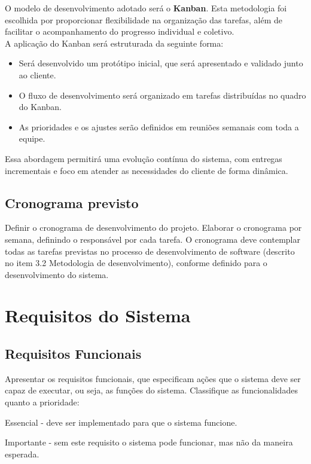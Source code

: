 \documentclass[a4paper,12pt]{article}
\begin{document}
O modelo de desenvolvimento adotado será o \textbf{Kanban}. Esta metodologia foi escolhida por proporcionar flexibilidade na organização das tarefas, além de facilitar o acompanhamento do progresso individual e coletivo.\\

A aplicação do Kanban será estruturada da seguinte forma:

\begin{itemize}
    \item Será desenvolvido um protótipo inicial, que será apresentado e validado junto ao cliente.
    \item O fluxo de desenvolvimento será organizado em tarefas distribuídas no quadro do Kanban.
    \item As prioridades e os ajustes serão definidos em reuniões semanais com toda a equipe.
\end{itemize}

Essa abordagem permitirá uma evolução contínua do sistema, com entregas incrementais e foco em atender as necessidades do cliente de forma dinâmica.


\subsection{Cronograma previsto}
Definir o cronograma de desenvolvimento do projeto. Elaborar o cronograma por semana, definindo o responsável por cada tarefa. O cronograma deve contemplar todas as tarefas previstas no processo de desenvolvimento de software (descrito no item 3.2 Metodologia de desenvolvimento), conforme definido para o desenvolvimento do sistema.

\newpage
\section{Requisitos do Sistema}
\subsection{Requisitos Funcionais}

Apresentar os requisitos funcionais, que especificam ações que o sistema deve ser capaz de executar, ou seja, as funções do sistema. Classifique as funcionalidades quanto a prioridade:

Essencial - deve ser implementado para que o sistema funcione.

Importante - sem este requisito o sistema pode funcionar, mas não da maneira esperada.
\end{document}
